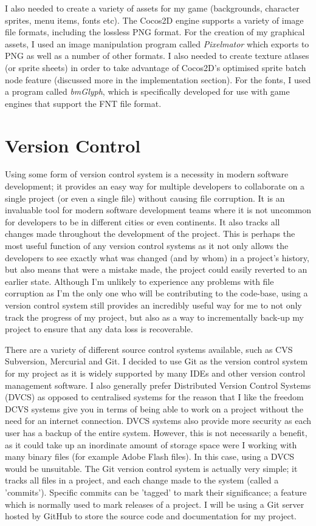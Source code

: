 \documentclass[a4paper,oneside]{report}
\begin{document}
I also needed to create a variety of assets for my game (backgrounds, character sprites, menu items, fonts etc). The Cocos2D engine supports a variety of image file formats, including the lossless PNG format. For the creation of my graphical assets, I used an image manipulation program called \emph{Pixelmator} which exports to PNG as well as a number of other formats. I also needed to create texture atlases (or sprite sheets) in order to take advantage of Cocos2D's optimised sprite batch node feature (discussed more in the implementation section). For the fonts, I used a program called \emph{bmGlyph}, which is specifically developed for use with game engines that support the FNT file format.

\section{Version Control}

Using some form of version control system is a necessity in modern software development; it provides an easy way for multiple developers to collaborate on a single project (or even a single file) without causing file corruption. It is an invaluable tool for modern software development teams where it is not uncommon for developers to be in different cities or even continents. It also tracks all changes made throughout the development of the project. This is perhaps the most useful function of any version control systems as it not only allows the developers to see exactly what was changed (and by whom) in a project's history, but also means that were a mistake made, the project could easily reverted to an earlier state. Although I'm unlikely to experience any problems with file corruption as I'm the only one who will be contributing to the code-base, using a version control system still provides an incredibly useful way for me to not only track the progress of my project, but also as a way to incrementally back-up my project to ensure that any data loss is recoverable.

There are a variety of different source control systems available, such as CVS Subversion, Mercurial and Git. I decided to use Git as the version control system for my project as it is widely supported by many IDEs and other version control management software. I also generally prefer Distributed Version Control Systems (DVCS) as opposed to centralised systems for the reason that I like the freedom DCVS systems give you in terms of being able to work on a project without the need for an internet connection. DVCS systems also provide more security as each user has a backup of the entire system. However, this is not necessarily a benefit, as it could take up an inordinate amount of storage space were I working with many binary files (for example Adobe Flash files). In this case, using a DVCS would be unsuitable. The Git version control system is actually very simple; it tracks all files in a project, and each change made to the system (called a 'commits'). Specific commits can be 'tagged' to mark their significance; a feature which is normally used to mark releases of a project. I will be using a Git server hosted by GitHub to store the source code and documentation for my project. 
\end{document}

